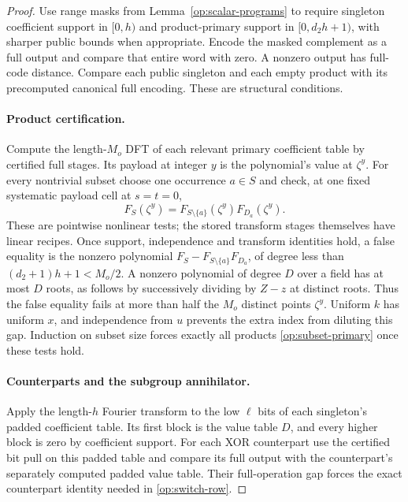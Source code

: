 \begin{proof}
Use range masks from Lemma~\ref{op:scalar-programs} to require
singleton coefficient support in $[0,h)$ and product-primary support
in $[0,d_2h+1)$, with sharper public bounds when appropriate.
Encode the masked complement as a full output and compare that
entire word with zero.  A nonzero output has full-code distance.
Compare each public singleton and each empty product with its
precomputed canonical full encoding.  These are structural conditions.

\paragraph{Product certification.}
Compute the length-$M_o$ DFT of each relevant primary coefficient
table by certified full stages.  Its payload at integer $y$ is the
polynomial's value at $\zeta^y$.  For every nontrivial subset choose
one occurrence $a\in S$ and check, at one fixed systematic payload
cell at $s=t=0$,
\begin{equation}\label{op:primary-product-test}
                   F_S(\zeta^y)
                  =F_{S\setminus\{a\}}(\zeta^y)F_{D_a}(\zeta^y).
\end{equation}
These are pointwise nonlinear tests; the stored transform stages
themselves have linear recipes.  Once support, independence and
transform identities hold, a false equality is the nonzero polynomial
$F_S-F_{S\setminus\{a\}}F_{D_a}$, of degree less than
$(d_2+1)h+1<M_o/2$.  A nonzero polynomial of degree $D$ over a field
has at most $D$ roots, as follows by successively dividing by $Z-z$
at distinct roots.  Thus the false equality fails at more than half
the $M_o$ distinct points $\zeta^y$.  Uniform $k$ has uniform $x$,
and independence from $u$ prevents the extra index from diluting this
gap.  Induction on subset size forces exactly all products
\eqref{op:subset-primary} once these tests hold.

\paragraph{Counterparts and the subgroup annihilator.}
Apply the length-$h$ Fourier transform to the low $\ell$ bits of each
singleton's padded coefficient table.  Its first block is the value
table $D$, and every higher block is zero by coefficient support.
For each XOR counterpart use the certified bit pull on this padded
table and compare its full output with the counterpart's separately
computed padded value table.  Their full-operation gap forces the
exact counterpart identity needed in \eqref{op:switch-row}.


\end{proof}

